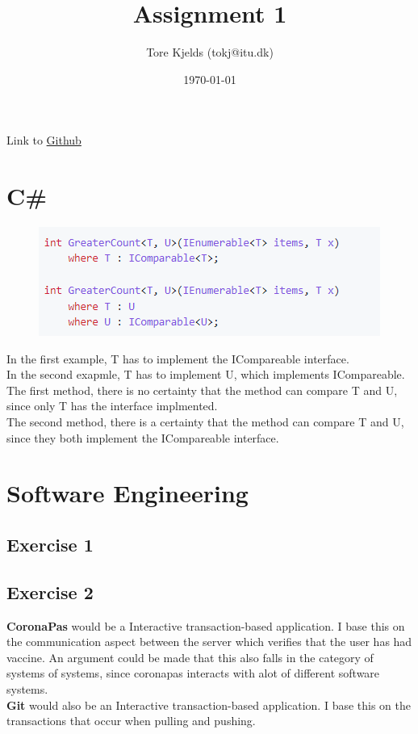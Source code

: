 \documentclass{article}
\title{Assignment 1}
\author{Tore Kjelds (tokj@itu.dk)}
\date{\today}
\begin{document}
\maketitle
Link to \href{https://github.com/tkjelds/BDSA_assignment01}{Github} 
\section*{C\#}
\begin{figure}[!htb]
    \includegraphics[scale = 0.7]{img/GreaterCount.png}
\end{figure}
In the first example, T has to implement the ICompareable interface. \\
In the second exapmle, T has to implement U, which implements ICompareable. \\ 
The first method, there is no certainty that the method can compare T and U, since only T has the interface implmented. \\
The second method, there is a certainty that the method can compare T and U, since they both implement the ICompareable interface. \\ 
\section*{Software Engineering}
\subsection*{Exercise 1}
\subsection*{Exercise 2}
\textbf{CoronaPas} would be a Interactive transaction-based application. I base this on the communication aspect between the server which verifies that the user has had vaccine. An argument could be made that this also falls in the category of systems of systems, since coronapas interacts with alot of different software systems. 
\\
\textbf{Git} would also be an Interactive transaction-based application. I base this on the transactions that occur when pulling and pushing. 
\end{document}
